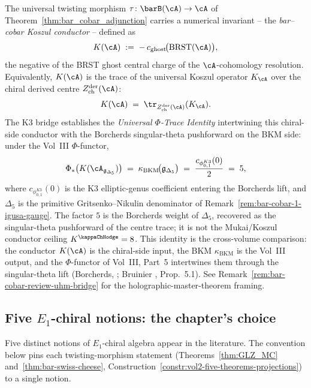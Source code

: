 \begin{remark}
\label{rem:bar-cobar-5-phi-trace-conductor}
The universal twisting morphism
$\tau\colon \barB(\cA) \to \cA$ of
Theorem~\ref{thm:bar_cobar_adjunction} carries a numerical
invariant -- the \emph{bar--cobar Koszul conductor} -- defined as
\[
K(\cA)
\;:=\;
-\,c_{\mathrm{ghost}}\!\bigl(\mathrm{BRST}(\cA)\bigr),
\]
the negative of the BRST ghost central charge of the
$\cA$-cohomology resolution. Equivalently, $K(\cA)$ is the trace
of the universal Koszul operator $K_\cA$ over the chiral derived
centre $Z^{\mathrm{der}}_{\mathrm{ch}}(\cA)$:
\[
K(\cA)
\;=\;
\tr_{Z^{\mathrm{der}}_{\mathrm{ch}}(\cA)}(K_\cA).
\]
The K3 bridge establishes the \emph{Universal $\Phi$-Trace Identity}
intertwining this chiral-side conductor with the
Borcherds singular-theta pushforward on the BKM side: under the
Vol~III $\Phi$-functor,
\[
\Phi_\ast\bigl(K(\cA_{\mathfrak{g}_{\Delta_5}})\bigr)
\;=\;
\kappa_{\mathrm{BKM}}\!\bigl(\mathfrak{g}_{\Delta_5}\bigr)
\;=\;
\frac{c_{\phi_{0,1}^{K3}}(0)}{2}
\;=\;
5,
\]
where $c_{\phi_{0,1}^{K3}}(0)$ is the K3 elliptic-genus coefficient
entering the Borcherds lift, and $\Delta_5$ is the primitive
Gritsenko--Nikulin denominator of
Remark~\ref{rem:bar-cobar-1-igusa-gauge}. The factor $5$ is
the Borcherds weight of $\Delta_5$, recovered as the singular-theta
pushforward of the centre trace; it is not the Mukai/Koszul conductor
ceiling $K^{\kappaChHodge}=8$.
This identity is the cross-volume comparison:
the conductor $K(\cA)$ is the chiral-side input, the BKM
$\kappa_{\mathrm{BKM}}$ is the Vol~III output, and the
$\Phi$-functor of Vol~III, Part~5 intertwines them through the
singular-theta lift (Borcherds, \cite{Bor98}; Bruinier
\cite{Bru02}, Prop.~5.1). See
Remark~\ref{rem:bar-cobar-review-uhm-bridge} for the
holographic-master-theorem framing.
\end{remark}

\subsection{Five $E_1$-chiral notions: the chapter's choice}
\label{subsec:bar-cobar-review-five-notions-discipline}

Five distinct notions of $E_1$-chiral algebra appear in the
literature. The convention below pins each twisting-morphism
statement (Theorems~\ref{thm:GLZ_MC} and~\ref{thm:bar-swiss-cheese},
Construction~\ref{constr:vol2-five-theorems-projections}) to a
single notion.


